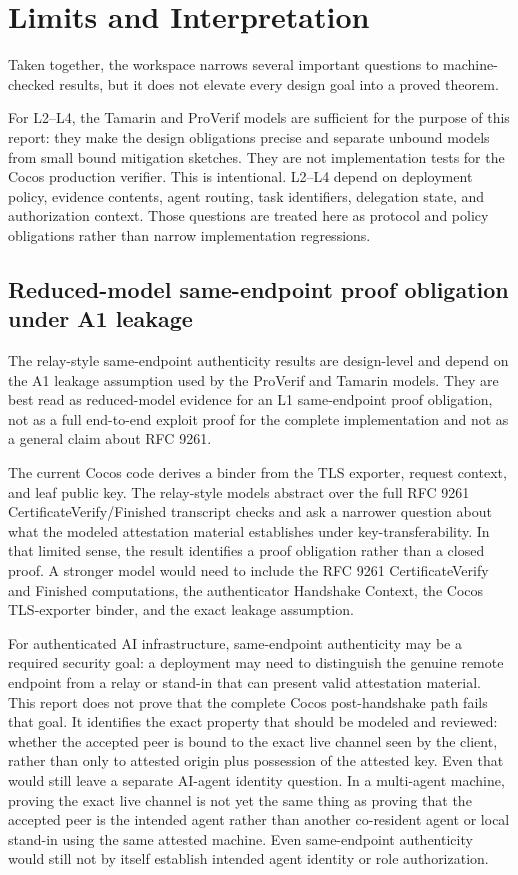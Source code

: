 \documentclass[11pt,a4paper]{article}
\begin{document}
\section{Limits and Interpretation}

Taken together, the workspace narrows several important questions to
machine-checked results, but it does not elevate every design goal into a
proved theorem.

For L2--L4, the Tamarin and ProVerif models are sufficient for the purpose of
this report: they make the design obligations precise and separate unbound
models from small bound mitigation sketches. They are not implementation tests
for the Cocos production verifier. This is intentional. L2--L4 depend on
deployment policy, evidence contents, agent routing, task identifiers,
delegation state, and authorization context. Those questions are treated here
as protocol and policy obligations rather than narrow implementation
regressions.

\subsection{Reduced-model same-endpoint proof obligation under A1 leakage}

The relay-style same-endpoint authenticity results are design-level and depend
on the A1 leakage assumption used by the ProVerif and Tamarin models. They are
best read as reduced-model evidence for an L1 same-endpoint proof obligation,
not as a full end-to-end exploit proof for the complete implementation and not
as a general claim about RFC 9261.

The current Cocos code derives a binder from the TLS exporter, request context,
and leaf public key. The relay-style models abstract over the full RFC 9261
CertificateVerify/Finished transcript checks and ask a narrower question about
what the modeled attestation material establishes under key-transferability.
In that limited sense, the result identifies a proof obligation rather than a
closed proof. A stronger model would need to include the RFC 9261
CertificateVerify and Finished computations, the authenticator Handshake
Context, the Cocos TLS-exporter binder, and the exact leakage assumption.

For authenticated AI infrastructure, same-endpoint authenticity may be a
required security goal: a deployment may need to distinguish the genuine remote
endpoint from a relay or stand-in that can present valid attestation material.
This report does not prove that the complete Cocos post-handshake path fails
that goal. It identifies the exact property that should be modeled and
reviewed: whether the accepted peer is bound to the exact live channel seen by
the client, rather than only to attested origin plus possession of the attested
key.
Even that would still leave a separate AI-agent identity question. In a
multi-agent machine, proving the exact live channel is not yet the same thing
as proving that the accepted peer is the intended agent rather than another
co-resident agent or local stand-in using the same attested machine.
Even same-endpoint authenticity would still not by itself establish intended
agent identity or role authorization.
\end{document}
